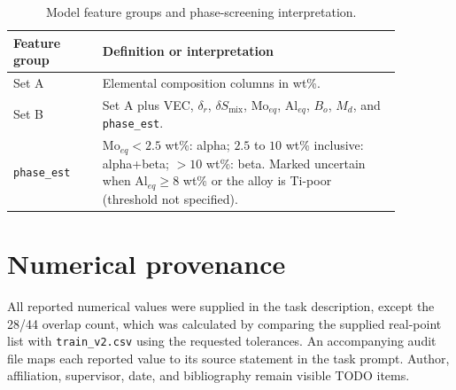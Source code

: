 \documentclass[11pt,oneside]{article}
\begin{document}
\begin{table}[H]
\centering
\caption{Model feature groups and phase-screening interpretation.}
\label{tab:features}
\begin{tabular}{p{0.20\linewidth}p{0.67\linewidth}}
\toprule
Feature group & Definition or interpretation\\
\midrule
Set A & Elemental composition columns in wt\%.\\
Set B & Set A plus VEC, \(\delta_r\), \(\delta S_{\mathrm{mix}}\), \(\mathrm{Mo}_{eq}\), \(\mathrm{Al}_{eq}\), \(B_o\), \(M_d\), and \texttt{phase\_est}.\\
\texttt{phase\_est} & \(\mathrm{Mo}_{eq}<2.5\) wt\%: alpha; \(2.5\) to \(10\) wt\% inclusive: alpha+beta; \(>10\) wt\%: beta. Marked uncertain when \(\mathrm{Al}_{eq}\geq 8\) wt\% or the alloy is Ti-poor (threshold not specified).\\
\bottomrule
\end{tabular}
\end{table}

\section{Numerical provenance}
All reported numerical values were supplied in the task description, except the 28/44 overlap count, which was calculated by comparing the supplied real-point list with \texttt{train\_v2.csv} using the requested tolerances. An accompanying audit file maps each reported value to its source statement in the task prompt. Author, affiliation, supervisor, date, and bibliography remain visible TODO items.
\end{document}
